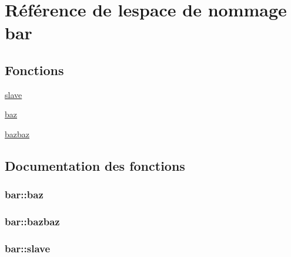 \hypertarget{namespacebar}{}\section{Référence de l\textquotesingle{}espace de nommage bar}
\label{namespacebar}
\subsection*{Fonctions}
\begin{DoxyCompactItemize}
\item 
\hyperlink{namespacebar_aa1678a9adb588c0b91b118de7cc38ddb}{slave}
\item 
\hyperlink{namespacebar_a3426cd3a2eebcffa0dc333bcf5e2fe5e}{baz}
\item 
\hyperlink{namespacebar_a88879545dee287d377e638b87cdf6dd7}{bazbaz}
\end{DoxyCompactItemize}


\subsection{Documentation des fonctions}
\hypertarget{namespacebar_a3426cd3a2eebcffa0dc333bcf5e2fe5e}{}
\subsubsection[{baz}]{\setlength{\rightskip}{0pt plus 5cm}bar\+::baz}\label{namespacebar_a3426cd3a2eebcffa0dc333bcf5e2fe5e}
\hypertarget{namespacebar_a88879545dee287d377e638b87cdf6dd7}{}
\subsubsection[{bazbaz}]{\setlength{\rightskip}{0pt plus 5cm}bar\+::bazbaz}\label{namespacebar_a88879545dee287d377e638b87cdf6dd7}
\hypertarget{namespacebar_aa1678a9adb588c0b91b118de7cc38ddb}{}
\subsubsection[{slave}]{\setlength{\rightskip}{0pt plus 5cm}bar\+::slave}\label{namespacebar_aa1678a9adb588c0b91b118de7cc38ddb}
